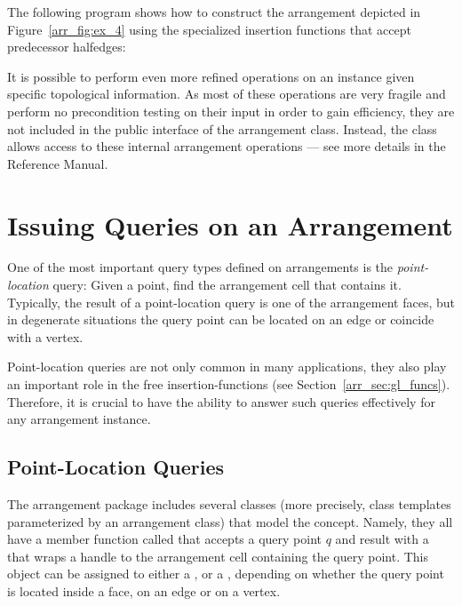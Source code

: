 \begin{ccAdvanced}
The following program shows how to construct the arrangement
depicted in Figure~\ref{arr_fig:ex_4} using the specialized
insertion functions that accept predecessor halfedges:


It is possible to perform even more refined operations on an
 instance given specific topological information.
As most of these operations are very fragile and perform no precondition
testing on their input in order to gain efficiency, they are not included
in the public interface of the arrangement class. Instead, the
 class allows access to these internal
arrangement operations --- see more details in the Reference Manual.
\end{ccAdvanced}

\section{Issuing Queries on an Arrangement}
\label{arr_sec:queries}
%
One of the most important query types defined on arrangements is
the {\em point-location} query: Given a point, find the
arrangement cell that contains it. Typically, the result of a
point-location query is one of the arrangement faces, but in
degenerate situations the query point can be located on an edge or
coincide with a vertex.

Point-location queries are not only common in many applications,
they also play an important role in the free insertion-functions
(see Section~\ref{arr_sec:gl_funcs}). Therefore, it is crucial to
have the ability to answer such queries effectively for any
arrangement instance.

\subsection{Point-Location Queries}
\label{arr_ssec:pl}
%
The arrangement package includes several classes (more precisely,
class templates parameterized by an arrangement class) that model
the  concept. Namely, they all
have a member function called  that accepts a query
point $q$ and result with a \cgal\  that wraps a handle
to the arrangement cell containing the query point. This object can
be assigned to either a ,
 or a , depending
on whether the query point is located inside a face, on an edge or
on a vertex.

